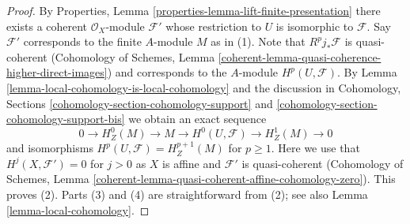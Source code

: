 \documentclass[10pt,a4paper]{amsart}
\theoremstyle{plain}
\theoremstyle{definition}
\theoremstyle{remark}
\numberwithin{equation}{subsection}
\begin{document}
\begin{proof}
By Properties, Lemma \ref{properties-lemma-lift-finite-presentation}
there exists a coherent $\mathcal{O}_X$-module $\mathcal{F}'$
whose restriction to $U$ is isomorphic to $\mathcal{F}$.
Say $\mathcal{F}'$ corresponds to the finite $A$-module $M$
as in (1).
Note that $R^pj_*\mathcal{F}$ is quasi-coherent
(Cohomology of Schemes, Lemma
\ref{coherent-lemma-quasi-coherence-higher-direct-images})
and corresponds to the $A$-module $H^p(U, \mathcal{F})$.
By Lemma \ref{lemma-local-cohomology-is-local-cohomology}
and the discussion in
Cohomology, Sections \ref{cohomology-section-cohomology-support} and
\ref{cohomology-section-cohomology-support-bis}
we obtain an exact sequence
$$
0 \to H^0_Z(M) \to M \to H^0(U, \mathcal{F}) \to H^1_Z(M) \to 0
$$
and isomorphisms $H^p(U, \mathcal{F}) = H^{p + 1}_Z(M)$ for $p \geq 1$.
Here we use that $H^j(X, \mathcal{F}') = 0$ for $j > 0$ as $X$ is affine
and $\mathcal{F}'$ is quasi-coherent (Cohomology of Schemes,
Lemma \ref{coherent-lemma-quasi-coherent-affine-cohomology-zero}).
This proves (2).
Parts (3) and (4) are straightforward from (2); see also
Lemma \ref{lemma-local-cohomology}.
\end{proof}
\end{document}
